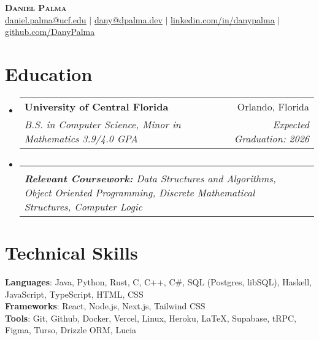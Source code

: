 \documentclass[letterpaper,11pt]{article}
\makeatletter
\newcommand{\resumeSubheading}[4]{
  \vspace{-2pt}\item
    \begin{tabular*}{0.97\textwidth}[t]{l@{\extracolsep{\fill}}r}
      \textbf{#1} & #2 \\
      \textit{\small#3} & \textit{\small #4} \\
    \end{tabular*}\vspace{-7pt}
}
\newcommand{\resumeSubHeadingListStart}{\begin{itemize}[leftmargin=0.15in, label={}]}
\newcommand{\resumeSubHeadingListEnd}{\end{itemize}}
\makeatother
\begin{document}

\begin{center}
    \textbf{\Huge \scshape Daniel Palma} \\ \vspace{1pt}
    \href{mailto:daniel.palma@ucf.edu}{\underline{daniel.palma@ucf.edu}} $|$ \href{mailto:dany@dpalma.dev}{\underline{dany@dpalma.dev}} $|$ 
    \href{https://linkedin.com/in/danypalma}{\underline{linkedin.com/in/danypalma}} $|$
    \href{https://github.com/DanyPalma}{\underline{github.com/DanyPalma}}
\end{center}


\section{Education}
  \resumeSubHeadingListStart
    \resumeSubheading
      {University of Central Florida}{Orlando, Florida}
      {B.S. in Computer Science, Minor in Mathematics 3.9/4.0 GPA}{Expected Graduation: 2026}
    
      \vspace{-15pt}
    \resumeSubheading
      {}{}
      {\scriptsize{\textbf{Relevant Coursework: }Data Structures and Algorithms, Object Oriented Programming, Discrete Mathematical Structures, Computer Logic}}{}
  \resumeSubHeadingListEnd

\section{Technical Skills}
\begin{itemize}[leftmargin=0.15in, label={}]
   \small{\item{
    \textbf{Languages}{: Java, Python, Rust, C, C++, C\#, SQL (Postgres, libSQL), Haskell,  JavaScript, TypeScript, HTML, CSS} \\
    \textbf{Frameworks}{: React, Node.js, Next.js, Tailwind CSS} \\
    \textbf{Tools}{: Git, Github, Docker, Vercel, Linux, Heroku, LaTeX, Supabase, tRPC, Figma, Turso, Drizzle ORM, Lucia} \\
   }}
\end{itemize}
\end{document}

